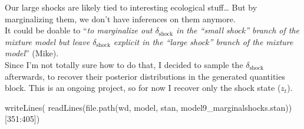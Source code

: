 \documentclass[
  letterpaper,
  DIV=11,
  numbers=noendperiod]{scrartcl}
\newenvironment{Shaded}{\begin{snugshade}}{\end{snugshade}}
\newcommand{\DecValTok}[1]{\textcolor[rgb]{0.68,0.00,0.00}{#1}}
\newcommand{\FunctionTok}[1]{\textcolor[rgb]{0.28,0.35,0.67}{#1}}
\newcommand{\NormalTok}[1]{\textcolor[rgb]{0.00,0.23,0.31}{#1}}
\newcommand{\SpecialCharTok}[1]{\textcolor[rgb]{0.37,0.37,0.37}{#1}}
\newcommand{\StringTok}[1]{\textcolor[rgb]{0.13,0.47,0.30}{#1}}
\begin{document}
Our large shocks are likely tied to interesting ecological stuff\ldots{}
But by marginalizing them, we don't have inferences on them anymore.\\
It could be doable to ``\emph{to marginalize out \(\delta_\text{shock}\)
in the ``small shock'' branch of the mixture model but leave
\(\delta_\text{shock}\) explicit in the ``large shock'' branch of the
mixture model}'' (Mike).\\
Since I'm not totally sure how to do that, I decided to sample the
\(\delta_\text{shock}\) afterwards, to recover their posterior
distributions in the generated quantities block. This is an ongoing
project, so for now I recover only the shock state (\(z_t\)).

\linespread{0.5}

\begin{Shaded}
\begin{Highlighting}[]
\FunctionTok{writeLines}\NormalTok{(}
  \FunctionTok{readLines}\NormalTok{(}\FunctionTok{file.path}\NormalTok{(wd, }\StringTok{\textquotesingle{}model\textquotesingle{}}\NormalTok{, }\StringTok{\textquotesingle{}stan\textquotesingle{}}\NormalTok{, }
                      \StringTok{\textquotesingle{}model9\_marginalshocks.stan\textquotesingle{}}\NormalTok{))[}\DecValTok{351}\SpecialCharTok{:}\DecValTok{405}\NormalTok{])}
\end{Highlighting}
\end{Shaded}
\end{document}
